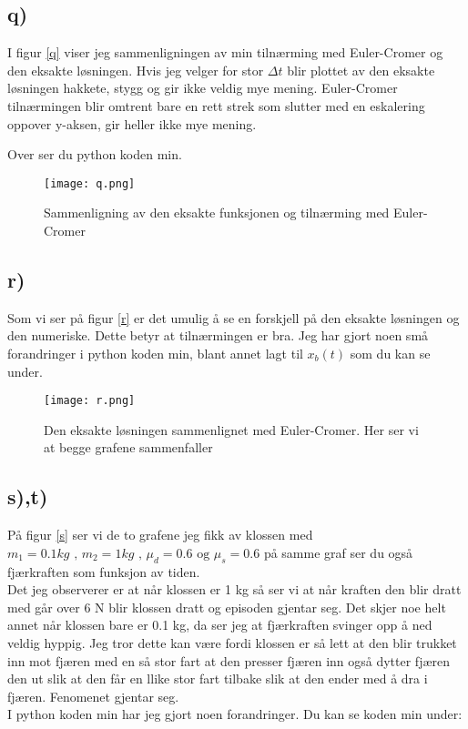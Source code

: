 \documentclass[a4paper,12pt,norsk]{article}
\begin{document}
\subsection*{q)}
I figur \vref{q} viser jeg sammenligningen av min tilnærming med Euler-Cromer og den eksakte løsningen. Hvis jeg velger for stor $\Delta{t}$ blir plottet av den eksakte løsningen hakkete, stygg og gir ikke veldig mye mening. Euler-Cromer tilnærmingen blir omtrent bare en rett strek som slutter med en eskalering oppover y-aksen, gir heller ikke mye mening. 

Over ser du python koden min.
\begin{figure}[h!]
\texttt{[image: q.png]} 
\caption{Sammenligning av den eksakte funksjonen og tilnærming med Euler-Cromer}
\label{q}
\end{figure} 

\subsection*{r)}
Som vi ser på figur \vref{r} er det umulig å se en forskjell på den eksakte løsningen og den numeriske. Dette betyr at tilnærmingen er bra. Jeg har gjort noen små forandringer i python koden min, blant annet lagt til $x_b(t)$ som du kan se under.

\begin{figure}[h!]
\texttt{[image: r.png]} 
\caption{Den eksakte løsningen sammenlignet med Euler-Cromer. Her ser vi at begge grafene sammenfaller}
\label{r}
\end{figure} 

\subsection*{s),t)}
På figur \vref{s} ser vi de to grafene jeg fikk av klossen med $m_1 = 0.1 kg \text{ , }m_2 = 1 kg \text{ , } \mu_d = 0.6 \text{ og } \mu_s = 0.6$ på samme graf ser du også fjærkraften som funksjon av tiden.\\ Det jeg observerer er at når klossen er 1 kg så ser vi at når kraften den blir dratt med går over 6 N blir klossen dratt og episoden gjentar seg. Det skjer noe helt annet når klossen bare er 0.1 kg, da ser jeg at fjærkraften svinger opp å ned veldig hyppig. Jeg tror dette kan være fordi klossen er så lett at den blir trukket inn mot fjæren med en så stor fart at den presser fjæren inn også dytter fjæren den ut slik at den får en llike stor fart tilbake slik at den ender med å dra i fjæren. Fenomenet gjentar seg.\\ 
I python koden min har jeg gjort noen forandringer. Du kan se koden min under:
\end{document}
